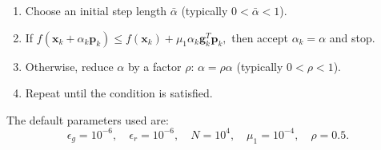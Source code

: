 \documentclass[12pt]{article}
\begin{document}
\begin{enumerate}
    \item Choose an initial step length \( \bar{\alpha} \) (typically \( 0 < \bar{\alpha} < 1 \)).
    \item If
    $
    f(\mathbf{x}_k + \alpha_k \mathbf{p}_k) \leq f(\mathbf{x}_k) + \mu_1 \alpha_k \mathbf{g}_k^T \mathbf{p}_k,
    $
    then accept \( \alpha_k = \alpha \) and stop.
    \item Otherwise, reduce \( \alpha \) by a factor \( \rho \): \( \alpha = \rho \alpha \) (typically \( 0 < \rho < 1 \)).
    \item Repeat until the condition is satisfied.
\end{enumerate}

The default parameters used are:
\[
\epsilon_g = 10^{-6}, \quad \epsilon_r = 10^{-6}, \quad N = 10^4, \quad \mu_1 = 10^{-4}, \quad \rho = 0.5.
\]
\end{document}
